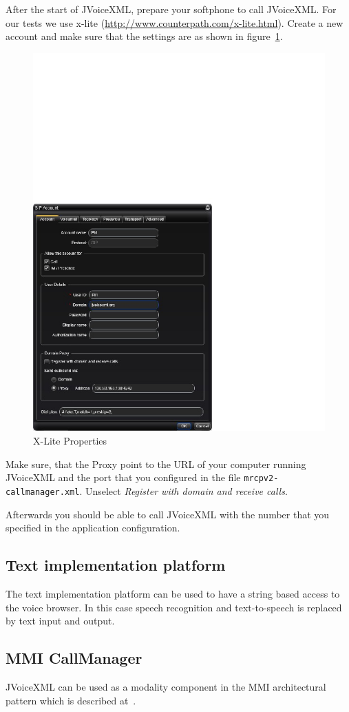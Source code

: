 \documentclass[11pt,a4paper]{book}
\begin{document}
After the start of JVoiceXML, prepare your softphone to call JVoiceXML.
For our
tests we use x-lite (\url{http://www.counterpath.com/x-lite.html}).
Create a new account and make
sure that the settings are as shown in figure~\ref{fig:sip-properties}.
\begin{figure}
\begin{center}
\includegraphics[width=.5\linewidth]{SIPProperties.jpg}
\end{center}
\caption{X-Lite Properties}
\label{fig:sip-properties}
\end{figure}
Make sure, that the Proxy point to the URL of your computer running JVoiceXML
and the port that you configured in the file \texttt{mrcpv2-callmanager.xml}. 
Unselect \emph{Register with domain and receive calls}.

Afterwards you should be able to call JVoiceXML with the number that you
specified in the application configuration.

\subsection{Text implementation platform}

The text implementation platform can be used to have a string based access to
the voice browser. In this case speech recognition and text-to-speech is
replaced by text input and output.

\subsection{MMI CallManager}

JVoiceXML can be used as a modality component in the MMI architectural pattern
which is described at~\cite{w3c:mmi}.
\end{document}
